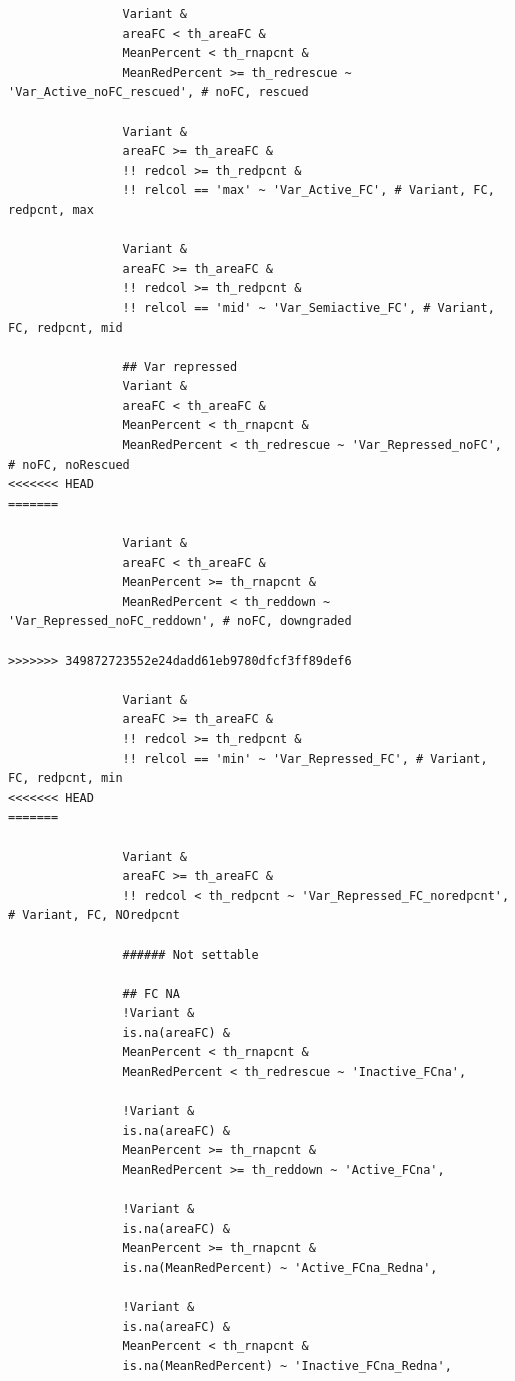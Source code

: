 \documentclass[11pt]{article}
\begin{document}
\begin{verbatim}
                Variant &
                areaFC < th_areaFC &
                MeanPercent < th_rnapcnt &
                MeanRedPercent >= th_redrescue ~ 'Var_Active_noFC_rescued', # noFC, rescued

                Variant &
                areaFC >= th_areaFC &
                !! redcol >= th_redpcnt &
                !! relcol == 'max' ~ 'Var_Active_FC', # Variant, FC, redpcnt, max

                Variant &
                areaFC >= th_areaFC &
                !! redcol >= th_redpcnt &
                !! relcol == 'mid' ~ 'Var_Semiactive_FC', # Variant, FC, redpcnt, mid

                ## Var repressed
                Variant &
                areaFC < th_areaFC &
                MeanPercent < th_rnapcnt &
                MeanRedPercent < th_redrescue ~ 'Var_Repressed_noFC', # noFC, noRescued
<<<<<<< HEAD
=======

                Variant &
                areaFC < th_areaFC &
                MeanPercent >= th_rnapcnt &
                MeanRedPercent < th_reddown ~ 'Var_Repressed_noFC_reddown', # noFC, downgraded

>>>>>>> 349872723552e24dadd61eb9780dfcf3ff89def6

                Variant &
                areaFC >= th_areaFC &
                !! redcol >= th_redpcnt &
                !! relcol == 'min' ~ 'Var_Repressed_FC', # Variant, FC, redpcnt, min
<<<<<<< HEAD
=======

                Variant &
                areaFC >= th_areaFC &
                !! redcol < th_redpcnt ~ 'Var_Repressed_FC_noredpcnt', # Variant, FC, NOredpcnt

                ###### Not settable

                ## FC NA
                !Variant &
                is.na(areaFC) &
                MeanPercent < th_rnapcnt &
                MeanRedPercent < th_redrescue ~ 'Inactive_FCna',

                !Variant &
                is.na(areaFC) &
                MeanPercent >= th_rnapcnt &
                MeanRedPercent >= th_reddown ~ 'Active_FCna',

                !Variant &
                is.na(areaFC) &
                MeanPercent >= th_rnapcnt &
                is.na(MeanRedPercent) ~ 'Active_FCna_Redna',

                !Variant &
                is.na(areaFC) &
                MeanPercent < th_rnapcnt &
                is.na(MeanRedPercent) ~ 'Inactive_FCna_Redna',


\end{verbatim}
\end{document}
